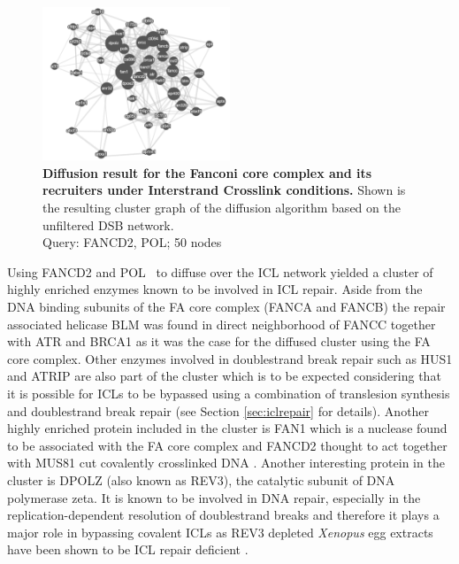 \begin{figure}[H]
    \centering
    \includegraphics[width=0.5\textwidth]{resources/images/Results/icl_diff_fancd2_polk.PNG}
    \caption[Diffusion result for FANCD2 and POL\textkappa~ under Interstrand Crosslink conditions]{\textbf{Diffusion result for the Fanconi core complex and its recruiters under Interstrand Crosslink conditions. }Shown is the resulting cluster graph of the diffusion algorithm based on the unfiltered DSB network.\\Query: FANCD2, POL\textkappa; 50 nodes}
    \label{fig:icl_diff_fancd2_polk}
\end{figure}
Using FANCD2 and POL\textkappa~ to diffuse over the ICL network yielded a cluster of highly enriched enzymes known to be involved in ICL repair. Aside from the DNA binding subunits of the FA core complex (FANCA and FANCB) the repair associated helicase BLM was found in direct neighborhood of FANCC together with ATR and BRCA1 as it was the case for the diffused cluster using the FA core complex. Other enzymes involved in doublestrand break repair such as HUS1 and ATRIP are also part of the cluster which is to be expected considering that it is possible for ICLs to be bypassed using a combination of translesion synthesis and doublestrand break repair (see Section \ref{sec:iclrepair} for details). Another highly enriched protein included in the cluster is FAN1 which is a nuclease found to be associated with the FA core complex and FANCD2 thought to act together with MUS81 cut covalently crosslinked DNA \citep{ODonnell.2010}. Another interesting protein in the cluster is DPOLZ (also known as REV3), the catalytic subunit of DNA polymerase zeta. It is known to be involved in DNA repair, especially in the replication-dependent resolution of doublestrand breaks and therefore it plays a major role in bypassing covalent ICLs \citep{Raschle.2008} as REV3 depleted \textit{Xenopus} egg extracts have been shown to be ICL repair deficient \citep{Raschle.2008}.

